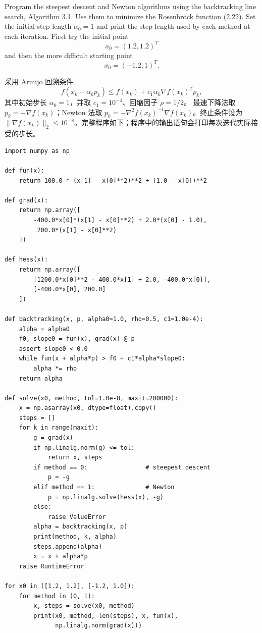 \documentclass{ctexart}
\begin{document}
\begin{problem}[3.1]
Program the steepest descent and Newton algorithms using the backtracking line
search, Algorithm 3.1. Use them to minimize the Rosenbrock function (2.22).
Set the initial step length $\alpha_0=1$ and print the step length used by each
method at each iteration. First try the initial point
\[
    x_0=(1.2,1.2)^T
\]
and then the more difficult starting point
\[
    x_0=(-1.2,1)^T.
\]
\end{problem}

\begin{solution}
采用 Armijo 回溯条件
\[
    f(x_k+\alpha_kp_k)
    \leq f(x_k)+c_1\alpha_k\nabla f(x_k)^Tp_k,
\]
其中初始步长 $\alpha_0=1$，并取 $c_1=10^{-4}$、回缩因子 $\rho=1/2$。
最速下降法取 $p_k=-\nabla f(x_k)$；Newton 法取
$p_k=-\nabla^2f(x_k)^{-1}\nabla f(x_k)$。终止条件设为
$\|\nabla f(x_k)\|_2\leq10^{-8}$。完整程序如下；程序中的输出语句会打印每次迭代实际接受的步长。

\begin{lstlisting}
import numpy as np

def fun(x):
    return 100.0 * (x[1] - x[0]**2)**2 + (1.0 - x[0])**2

def grad(x):
    return np.array([
        -400.0*x[0]*(x[1] - x[0]**2) + 2.0*(x[0] - 1.0),
         200.0*(x[1] - x[0]**2)
    ])

def hess(x):
    return np.array([
        [1200.0*x[0]**2 - 400.0*x[1] + 2.0, -400.0*x[0]],
        [-400.0*x[0], 200.0]
    ])

def backtracking(x, p, alpha0=1.0, rho=0.5, c1=1.0e-4):
    alpha = alpha0
    f0, slope0 = fun(x), grad(x) @ p
    assert slope0 < 0.0
    while fun(x + alpha*p) > f0 + c1*alpha*slope0:
        alpha *= rho
    return alpha

def solve(x0, method, tol=1.0e-8, maxit=200000):
    x = np.asarray(x0, dtype=float).copy()
    steps = []
    for k in range(maxit):
        g = grad(x)
        if np.linalg.norm(g) <= tol:
            return x, steps
        if method == 0:                # steepest descent
            p = -g
        elif method == 1:              # Newton
            p = np.linalg.solve(hess(x), -g)
        else:
            raise ValueError
        alpha = backtracking(x, p)
        print(method, k, alpha)
        steps.append(alpha)
        x = x + alpha*p
    raise RuntimeError

for x0 in ([1.2, 1.2], [-1.2, 1.0]):
    for method in (0, 1):
        x, steps = solve(x0, method)
        print(x0, method, len(steps), x, fun(x),
              np.linalg.norm(grad(x)))
\end{lstlisting}


\end{solution}
\end{document}
